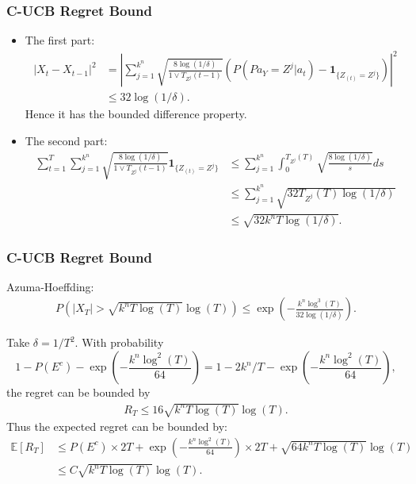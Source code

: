 \documentclass{beamer}
\begin{document}
\begin{frame}
	\frametitle{C-UCB Regret Bound}	
	\begin{itemize}
		\item The first part:
			\begin{align*}
			|X_t-X_{t-1}|^2 &= \left|\sum_{j=1}^{k^n}\sqrt{\frac{8\log(1/\delta)}{1\vee T_{Z^j}(t-1)}}\left(P(Pa_Y=Z^j|a_t)-\mathbf{1}_{\{Z_{(t)}=Z^j\}}\right)\right|^2\\
			&\leq 32\log(1/\delta).
			\end{align*}			
			Hence it has the bounded difference property.
					
		\item The second part:
			\begin{align*}
			\sum_{t=1}^{T} \sum_{j=1}^{k^n}\sqrt{\frac{8\log(1/\delta)}{1\vee T_{Z^j}(t-1)}}\mathbf{1}_{\{Z_{(t)}=Z^j\}} &\leq \sum_{j=1}^{k^n}\int_{0}^{T_{Z^j}(T)}\sqrt{\frac{8\log(1/\delta)}{s}} ds\\
			&\leq \sum_{j=1}^{k^n} \sqrt{32T_{Z^j}(T)\log(1/\delta)}\\
			&\leq \sqrt{32k^nT\log(1/\delta)}.
			\end{align*}			
	\end{itemize}
\end{frame}


\begin{frame}
	\frametitle{C-UCB Regret Bound}
	Azuma-Hoeffding: \begin{align*}
	P(|X_T|>\sqrt{k^nT\log(T)}\log(T)) \leq \exp\left(-\frac{k^n\log^3(T)}{32\log(1/\delta)}\right).
	\end{align*}
	
	Take $\delta = 1/T^2$. With probability $$1-P(E^c)-\exp\left(-\frac{k^n\log^2(T)}{64}\right) = 1-2k^n/T-\exp\left(-\frac{k^n\log^2(T)}{64}\right),$$ the regret can be bounded by
	\begin{align*}
	R_T \leq 16\sqrt{k^nT\log(T)}\log(T).
	\end{align*}
	Thus the expected regret can be bounded by:
	\begin{align*}
	\mathbb{E}\left[R_T\right] &\leq P(E^c)\times 2T+\exp\left(-\frac{k^n\log^2(T)}{64}\right)\times 2T+\sqrt{64k^nT\log(T)}\log(T)\\
	&\leq C\sqrt{k^nT\log(T)}\log(T).
	\end{align*}
\end{frame}
\end{document}
